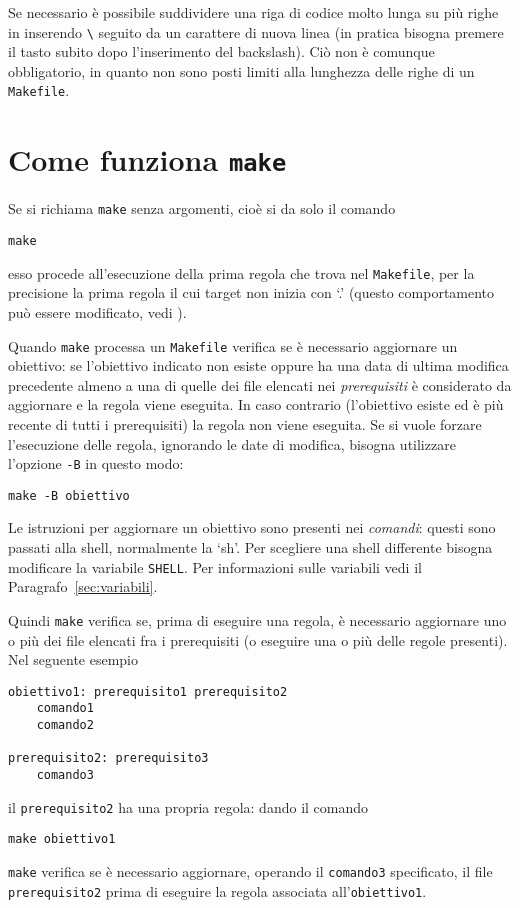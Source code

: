 Se necessario è possibile suddividere una riga di codice molto lunga su più
righe in inserendo \verb|\| seguito da un carattere di nuova linea (in pratica
bisogna premere il tasto  subito dopo l'inserimento del
backslash).  Ciò non è comunque obbligatorio, in quanto non sono posti limiti
alla lunghezza delle righe di un \verb|Makefile|.


\section{Come funziona \texttt{make}}
\label{sec:come-funziona}

Se si richiama \verb|make| senza argomenti, cioè si da solo il comando
\begin{verbatim}
make
\end{verbatim}
esso procede all'esecuzione della prima regola che trova nel \verb|Makefile|,
per la precisione la prima regola il cui target non inizia con `.' (questo
comportamento può essere modificato, vedi \textcite[5]{gnu:make}).

Quando \verb|make| processa un \verb|Makefile| verifica se è necessario
aggiornare un obiettivo: se l'obiettivo indicato non esiste oppure ha una data
di ultima modifica precedente almeno a una di quelle dei file elencati nei
\emph{prerequisiti} è considerato da aggiornare e la regola viene eseguita.  In
caso contrario (l'obiettivo esiste ed è più recente di tutti i prerequisiti) la
regola non viene eseguita.  Se si vuole forzare l'esecuzione delle regola,
ignorando le date di modifica, bisogna utilizzare l'opzione \texttt{-B} in
questo modo:
\begin{verbatim}
make -B obiettivo
\end{verbatim}

Le istruzioni per aggiornare un obiettivo sono presenti nei \emph{comandi}:
questi sono passati alla shell, normalmente la `sh'.  Per scegliere una shell
differente bisogna modificare la variabile \verb|SHELL|.  Per informazioni sulle
variabili vedi il Paragrafo~\vref{sec:variabili}.

Quindi \verb|make| verifica se, prima di eseguire una regola, è necessario
aggiornare uno o più dei file elencati fra i prerequisiti (o eseguire una o più
delle regole presenti).  Nel seguente esempio
\begin{lstlisting}
obiettivo1: prerequisito1 prerequisito2
	comando1
	comando2

prerequisito2: prerequisito3
	comando3
\end{lstlisting}
il \verb|prerequisito2| ha una propria regola: dando il comando
\begin{verbatim}
make obiettivo1
\end{verbatim}
\verb|make| verifica se è necessario aggiornare, operando il \verb|comando3|
specificato, il file \verb|prerequisito2| prima di eseguire la regola associata
all'\verb|obiettivo1|.


